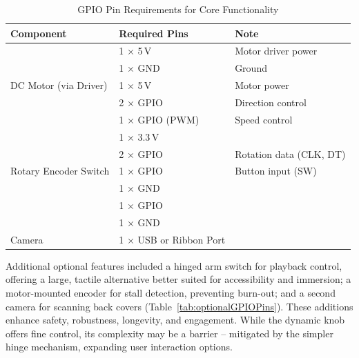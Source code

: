                 \begin{table}[htbp]
                    \centering
                    \caption{GPIO Pin Requirements for Core Functionality}
                    \label{tab:coreGPIOPins}
                    \begin{tabular}{|l|l|l|}
                        \hline
                        \textbf{Component} & \textbf{Required Pins} & \textbf{Note}\\ \hline
                        \multirow{5}{*}{DC Motor (via Driver)} & 1 × 5\,V & Motor driver power \\ \cline{2-3}
                                                               & 1 × GND & Ground \\ \cline{2-3}
                                                               & 1 × 5\,V & Motor power \\ \cline{2-3}
                                                               & 2 × GPIO & Direction control \\ \cline{2-3}
                                                               & 1 × GPIO (PWM) & Speed control \\ \hline
                        \multirow{5}{*}{Rotary Encoder Switch} & 1 × 3.3\,V & \\ \cline{2-3}
                                                               & 2 × GPIO& Rotation data (CLK, DT)\\ \cline{2-3}
                                                               & 1 × GPIO & Button input (SW)\\ \cline{2-3}
                                                               & 1 × GND & \\ \hline
                        \multirow{2}{*}{Button (Camera Trigger)} & 1 × GPIO & \\ \cline{2-3}
                                                                 & 1 × GND & \\ \hline
                        Camera & 1 × USB or Ribbon Port & \\ \hline
                    \end{tabular}
                \end{table}
    
                Additional optional features included a hinged arm switch for playback control, offering a large, tactile alternative better suited for accessibility and immersion; a motor-mounted encoder for stall detection, preventing burn-out; and a second camera for scanning back covers (Table~\ref{tab:optionalGPIOPins}). These additions enhance safety, robustness, longevity, and engagement. While the dynamic knob offers fine control, its complexity may be a barrier -- mitigated by the simpler hinge mechanism, expanding user interaction options.
    
